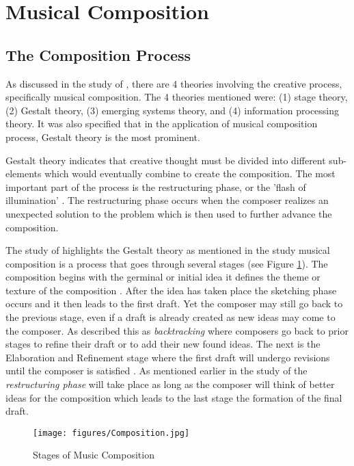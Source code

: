 \section{Musical Composition}
\subsection{The Composition Process}
As discussed in the study of , there are 4 theories involving the creative process, specifically musical composition. The 4 theories mentioned were: (1) stage theory, (2) Gestalt theory, (3) emerging systems theory, and (4) information processing theory. It was also specified that in the application of musical composition process, Gestalt theory is the most prominent. 

Gestalt theory indicates that creative thought must be divided into different sub-elements which would eventually combine to create the composition. The most important part of the process is the restructuring phase, or the 'flash of illumination' \cite{collins2005synthesis}. The restructuring phase occurs when the composer realizes an unexpected solution to the problem which is then used to further advance the composition.

The study of  highlights the Gestalt theory as mentioned in the study musical composition is a process that goes through several stages (see Figure \ref{fig:composition}). The composition begins with the germinal  or initial idea it defines the theme or texture of the composition \cite{bennett1976process,collins2005synthesis}. After the idea has taken place the sketching phase occurs and it then leads to the first draft. Yet the composer may still go back to the previous stage, even if a draft is already created as new ideas may come to the composer. As  described this as \textit{backtracking} where composers go back to prior stages to refine their draft or to add their new found ideas. The next is the Elaboration and Refinement stage where the first draft will undergo revisions until the composer is satisfied \cite{bennett1976process}. As mentioned earlier in the study of   the \textit{restructuring phase} will take place as long as the composer will think of better ideas for the composition which leads to the last stage the formation of the final draft.  

\begin{figure}[H]
    \centering
    \texttt{[image: figures/Composition.jpg]}
    \caption{Stages of Music Composition \protect\cite{bennett1976process}}
    \label{fig:composition}
\end{figure}

